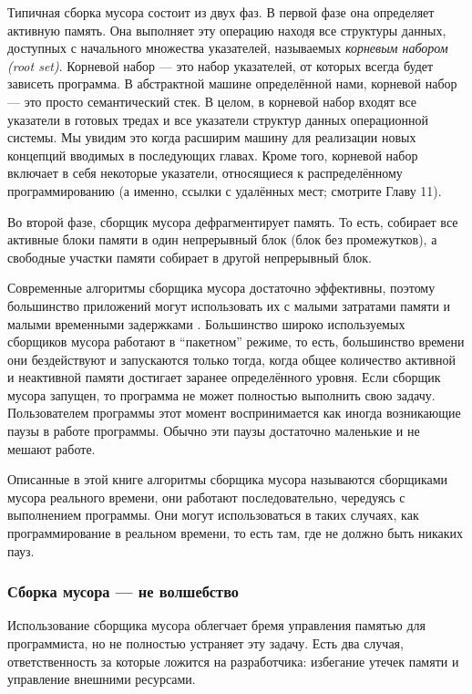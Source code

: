 Типичная сборка мусора состоит из двух фаз. В первой фазе она определяет активную память. Она выполняет эту операцию находя все структуры данных, доступных с начального множества указателей, называемых \emph{корневым набором (root set)}. Корневой набор --- это набор указателей, от которых всегда будет зависеть программа. В абстрактной машине определённой нами, корневой набор --- это просто семантический стек. В целом, в корневой набор входят все указатели в готовых тредах и все указатели структур данных операционной системы. Мы увидим это когда расширим машину для реализации новых концепций вводимых в последующих главах. Кроме того, корневой набор включает в себя некоторые указатели, относящиеся к распределённому программированию (а именно, ссылки с удалённых мест; смотрите Главу 11).

Во второй фазе, сборщик мусора дефрагментирует память. То есть, собирает все активные блоки памяти в один непрерывный блок (блок без промежутков), а свободные участки памяти собирает в другой непрерывный блок.

Современные алгоритмы сборщика мусора достаточно эффективны, поэтому большинство приложений могут использовать их с малыми затратами памяти и малыми временными задержками \cite{95}. Большинство широко используемых сборщиков мусора работают в ``пакетном'' режиме, то есть, большинство времени они бездействуют и запускаются только тогда, когда общее количество активной и неактивной памяти достигает заранее определённого уровня. Если сборщик мусора запущен, то программа не может полностью выполнить свою задачу. Пользователем программы этот момент воспринимается как иногда возникающие паузы в работе программы. Обычно эти паузы достаточно маленькие и не мешают работе.

Описанные в этой книге алгоритмы сборщика мусора называются сборщиками мусора реального времени, они работают последовательно, чередуясь с выполнением программы. Они могут использоваться в таких случаях, как программирование в реальном времени, то есть там, где не должно быть никаких пауз.

\subsubsection{Сборка мусора --- не волшебство}

Использование сборщика мусора облегчает бремя управления памятью для программиста, но не полностью устраняет эту задачу. Есть два случая, ответственность за которые ложится на разработчика: избегание утечек памяти и управление внешними ресурсами.

